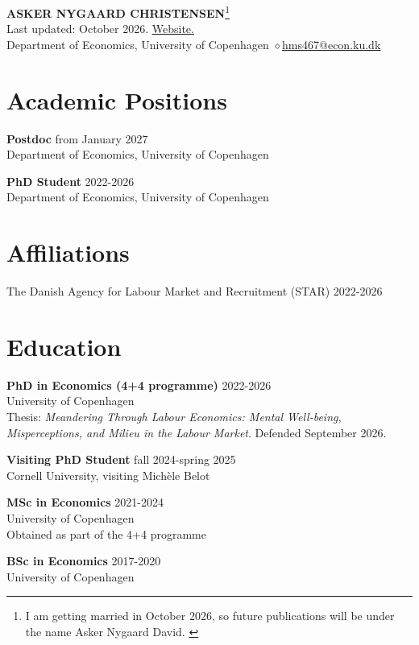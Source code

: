 \documentclass[12pt,a4paper]{article}
\newcommand{\sep}{\ensuremath{\diamond}}
\newlength{\cvindent}
\newenvironment{cvbody}{%
  \begin{adjustwidth}{\cvindent}{}%
  \setlength{\parindent}{0pt}%
}{%
  \end{adjustwidth}%
}
\begin{document}
\begin{center}
    {\Large \textbf{ASKER NYGAARD CHRISTENSEN}\footnote{I am getting married in October 2026, so future publications will be under the name Asker Nygaard David. \label{fnote:name}}} \\[0.15cm]
    {\small Last updated: October 2026. \href{https://askernc.github.io}{\underline{Website.}}}   \\[0.1cm]
    {\small Department of Economics, University of Copenhagen \quad \sep \quad \href{mailto:hms467@econ.ku.dk}{hms467@econ.ku.dk}}
\end{center}




\section{Academic Positions}
\begin{cvbody}
\textbf{Postdoc} \hfill from January 2027 \\
Department of Economics, University of Copenhagen

\medskip
\textbf{PhD Student} \hfill 2022-2026 \\
Department of Economics, University of Copenhagen

\end{cvbody}
\section{Affiliations}
\begin{cvbody}
The Danish Agency for Labour Market and Recruitment (STAR) \hfill 2022-2026
\end{cvbody}

\section{Education}
\begin{cvbody}
\textbf{PhD in Economics (4+4 programme)} \hfill 2022-2026 \\
University of Copenhagen \\
{\small Thesis: \textit{Meandering Through Labour Economics: Mental Well-being, Misperceptions, and Milieu in the Labour Market}. Defended September 2026.}

\medskip

\textbf{Visiting PhD Student} \hfill fall 2024-spring 2025 \\
Cornell University, visiting Michèle Belot

\medskip
\textbf{MSc in Economics} \hfill 2021-2024 \\
University of Copenhagen \\
{\small Obtained as part of the 4+4 programme}

\medskip
\textbf{BSc in Economics} \hfill 2017-2020 \\
University of Copenhagen
\end{cvbody}
\end{document}
